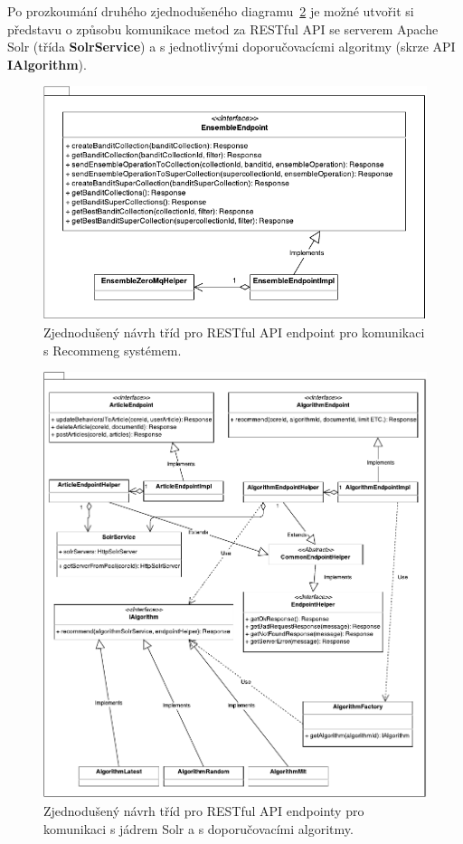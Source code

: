\documentclass[thesis=M,czech]{FITthesis}[2014/05/07]
\begin{document}
Po prozkoumání druhého zjednodušeného diagramu~\ref{fig:recommengRestNavrh2} je možné utvořit si představu o způsobu komunikace metod za RESTful API se serverem Apache Solr (třída \textbf{SolrService}) a s jednotlivými doporučovacícmi algoritmy (skrze API \textbf{IAlgorithm}).

\begin{figure}\centering
	\includegraphics[width=1.0\textwidth]{obr/rest1.pdf}
 	\caption[Zjednodušený návrh tříd pro RESTful API endpoint pro komunikaci s Recommeng systémem.]{Zjednodušený návrh tříd pro RESTful API endpoint pro komunikaci s Recommeng systémem.}\label{fig:recommengRestNavrh}
\end{figure}	

\begin{figure}\centering
	\includegraphics[width=1.0\textwidth]{obr/rest2.pdf}
 	\caption[Zjednodušený návrh tříd pro RESTful API endpointy pro komunikaci s jádrem Solr a s doporučovacími algoritmy.]{Zjednodušený návrh tříd pro RESTful API endpointy pro komunikaci s jádrem Solr a s doporučovacími algoritmy.}\label{fig:recommengRestNavrh2}
\end{figure}	
\end{document}
